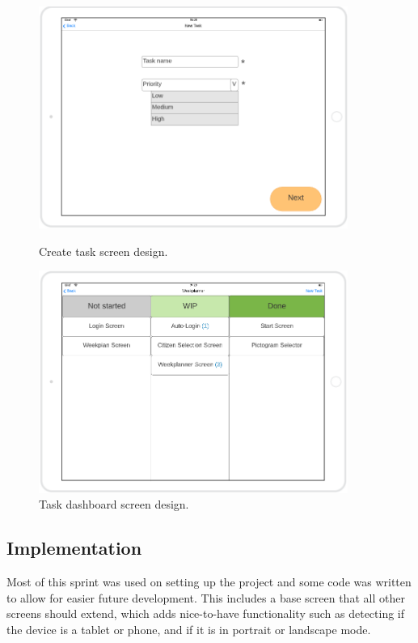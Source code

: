\begin{figure}[H]
    \centering
    \begin{minipage}{0.45\textwidth}
        \centering
        \includegraphics[width=0.9\textwidth]{Sprint_1/images/create_task_screen.png}
        \caption{Create task screen design.}
        \label{create_task_screen}
    \end{minipage}\hfill
    \begin{minipage}{0.45\textwidth}
        \centering
        \includegraphics[width=0.9\textwidth]{Sprint_1/images/task_dashboard_screen.png}
        \caption{Task dashboard screen design.}
        \label{task_dashboard_screen}
    \end{minipage}
\end{figure}

\subsection{Implementation}
Most of this sprint was used on setting up the project and some code was written to allow for easier future development.
This includes a base screen that all other screens should extend, which adds nice-to-have functionality such as detecting if the device is a tablet or phone, and if it is in portrait or landscape mode.

